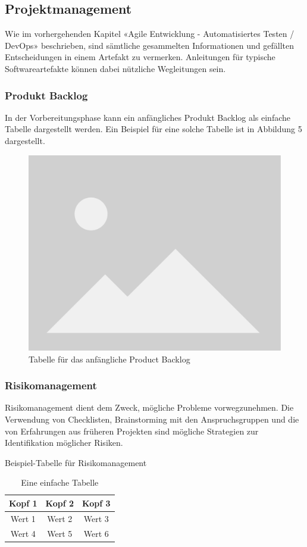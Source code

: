 \documentclass[main.tex]{subfiles} %
\begin{document}
\subsection{Projektmanagement}

Wie im vorhergehenden Kapitel «Agile Entwicklung - Automatisiertes Testen / DevOps»
beschrieben, sind sämtliche gesammelten Informationen und gefällten Entscheidungen
in einem Artefakt zu vermerken. Anleitungen für typische Softwareartefakte können
dabei nützliche Wegleitungen sein.

\subsubsection{Produkt Backlog}

In der Vorbereitungsphase kann ein anfängliches Produkt Backlog als einfache Tabelle
dargestellt werden. Ein Beispiel für eine solche Tabelle ist in Abbildung 5 dargestellt.



\begin{figure}[h]
    \centering
    \includegraphics[width=0.7\linewidth]{img/placeholder.png}
    \caption{Tabelle für das anfängliche Product Backlog}
    \label{fig:backlog_table}
\end{figure}


\subsubsection{Risikomanagement}
Risikomanagement dient dem Zweck, mögliche Probleme vorwegzunehmen. Die Verwendung von
Checklisten, Brainstorming mit den Anspruchsgruppen und die von Erfahrungen
aus früheren Projekten sind mögliche Strategien zur Identifikation möglicher Risiken.

\begin{table}[h]
    \centering
    \caption{Beispiel-Tabelle für Risikomanagement}
    \begin{tabular}{|c|c|c|}
        \hline
        Kopf 1 & Kopf 2 & Kopf 3 \\
        \hline
        Wert 1 & Wert 2 & Wert 3 \\
        \hline
        Wert 4 & Wert 5 & Wert 6 \\
        \hline
    \end{tabular}
    \caption{Eine einfache Tabelle}
    \label{tab:meineTabelle}

\end{table}
\end{document}
